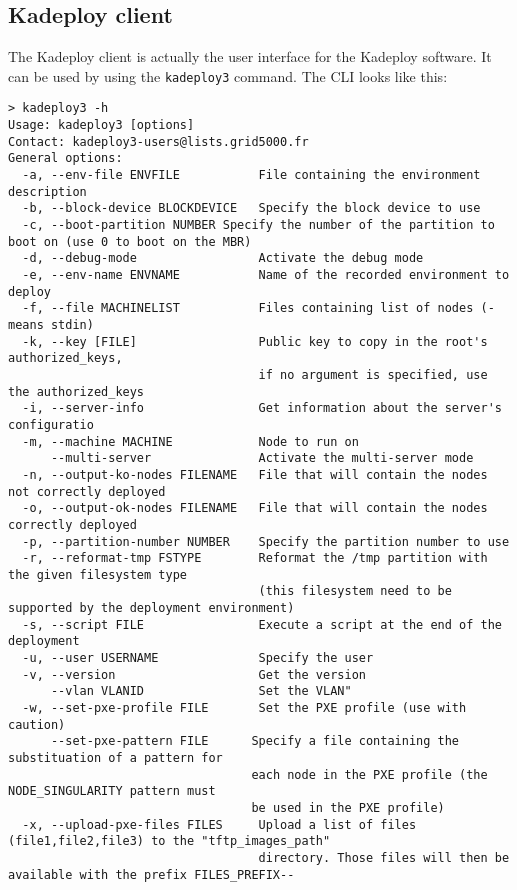 \documentclass[a4wide,10pt,oneside]{book}
\begin{document}
\subsection{Kadeploy client}\label{sec:kadeploy_client}
The Kadeploy client is actually the user interface for the Kadeploy software. It can be used by using the \texttt{kadeploy3} command. The CLI looks like this:
\begin{small}
\begin{verbatim}
> kadeploy3 -h
Usage: kadeploy3 [options]
Contact: kadeploy3-users@lists.grid5000.fr
General options:
  -a, --env-file ENVFILE           File containing the environment description
  -b, --block-device BLOCKDEVICE   Specify the block device to use
  -c, --boot-partition NUMBER Specify the number of the partition to boot on (use 0 to boot on the MBR)
  -d, --debug-mode                 Activate the debug mode
  -e, --env-name ENVNAME           Name of the recorded environment to deploy
  -f, --file MACHINELIST           Files containing list of nodes (- means stdin)
  -k, --key [FILE]                 Public key to copy in the root's authorized_keys, 
                                   if no argument is specified, use the authorized_keys
  -i, --server-info                Get information about the server's configuratio
  -m, --machine MACHINE            Node to run on
      --multi-server               Activate the multi-server mode
  -n, --output-ko-nodes FILENAME   File that will contain the nodes not correctly deployed
  -o, --output-ok-nodes FILENAME   File that will contain the nodes correctly deployed
  -p, --partition-number NUMBER    Specify the partition number to use
  -r, --reformat-tmp FSTYPE        Reformat the /tmp partition with the given filesystem type
                                   (this filesystem need to be supported by the deployment environment)
  -s, --script FILE                Execute a script at the end of the deployment
  -u, --user USERNAME              Specify the user
  -v, --version                    Get the version
      --vlan VLANID                Set the VLAN"
  -w, --set-pxe-profile FILE       Set the PXE profile (use with caution)
      --set-pxe-pattern FILE      Specify a file containing the substituation of a pattern for 
                                  each node in the PXE profile (the NODE_SINGULARITY pattern must
                                  be used in the PXE profile)
  -x, --upload-pxe-files FILES     Upload a list of files (file1,file2,file3) to the "tftp_images_path"
                                   directory. Those files will then be available with the prefix FILES_PREFIX--

\end{verbatim}
\end{small}
\end{document}
